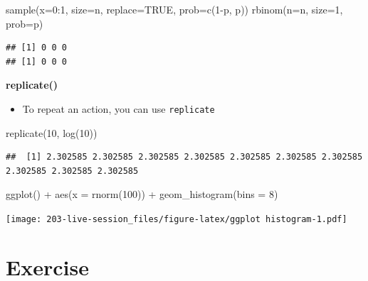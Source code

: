 \documentclass[
]{book}
\newenvironment{Shaded}{\begin{snugshade}}{\end{snugshade}}
\newcommand{\AttributeTok}[1]{\textcolor[rgb]{0.77,0.63,0.00}{#1}}
\newcommand{\ConstantTok}[1]{\textcolor[rgb]{0.00,0.00,0.00}{#1}}
\newcommand{\DecValTok}[1]{\textcolor[rgb]{0.00,0.00,0.81}{#1}}
\newcommand{\FunctionTok}[1]{\textcolor[rgb]{0.00,0.00,0.00}{#1}}
\newcommand{\NormalTok}[1]{#1}
\newcommand{\SpecialCharTok}[1]{\textcolor[rgb]{0.00,0.00,0.00}{#1}}
\newcommand{\StringTok}[1]{\textcolor[rgb]{0.31,0.60,0.02}{#1}}
\providecommand{\tightlist}{%
  \setlength{\itemsep}{0pt}\setlength{\parskip}{0pt}}
\theoremstyle{definition}
\theoremstyle{definition}
\theoremstyle{definition}
\theoremstyle{definition}
\theoremstyle{remark}
\begin{document}
\begin{Shaded}
\begin{Highlighting}[]
\FunctionTok{sample}\NormalTok{(}\AttributeTok{x=}\DecValTok{0}\SpecialCharTok{:}\DecValTok{1}\NormalTok{, }\AttributeTok{size=}\NormalTok{n, }\AttributeTok{replace=}\ConstantTok{TRUE}\NormalTok{, }\AttributeTok{prob=}\FunctionTok{c}\NormalTok{(}\DecValTok{1}\SpecialCharTok{{-}}\NormalTok{p, p))}
\FunctionTok{rbinom}\NormalTok{(}\AttributeTok{n=}\NormalTok{n, }\AttributeTok{size=}\DecValTok{1}\NormalTok{, }\AttributeTok{prob=}\NormalTok{p)}
\end{Highlighting}
\end{Shaded}

\begin{verbatim}
## [1] 0 0 0
## [1] 0 0 0
\end{verbatim}

\textbf{replicate()}

\begin{itemize}
\tightlist
\item
  To repeat an action, you can use \texttt{replicate}
\end{itemize}

\begin{Shaded}
\begin{Highlighting}[]
\FunctionTok{replicate}\NormalTok{(}\DecValTok{10}\NormalTok{, }\FunctionTok{log}\NormalTok{(}\DecValTok{10}\NormalTok{))}
\end{Highlighting}
\end{Shaded}

\begin{verbatim}
##  [1] 2.302585 2.302585 2.302585 2.302585 2.302585 2.302585 2.302585 2.302585 2.302585 2.302585
\end{verbatim}

\begin{Shaded}
\begin{Highlighting}[]
\FunctionTok{ggplot}\NormalTok{() }\SpecialCharTok{+} 
  \FunctionTok{aes}\NormalTok{(}\AttributeTok{x =} \FunctionTok{rnorm}\NormalTok{(}\DecValTok{100}\NormalTok{)) }\SpecialCharTok{+} 
  \FunctionTok{geom\_histogram}\NormalTok{(}\AttributeTok{bins =} \StringTok{\textquotesingle{}8\textquotesingle{}}\NormalTok{) }
\end{Highlighting}
\end{Shaded}

\texttt{[image: 203-live-session\_files/figure-latex/ggplot histogram-1.pdf]}

\hypertarget{exercise}{%
\section{Exercise}\label{exercise}}
\end{document}
